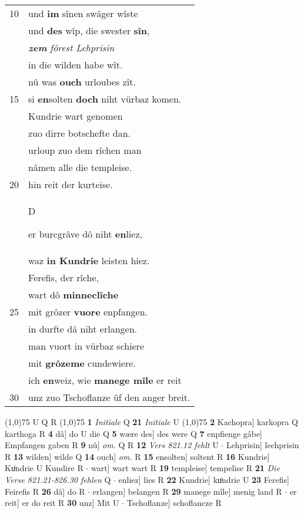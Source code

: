 \documentclass[8pt,a4paper,notitlepage]{article}
\begin{document}
\begin{table}[ht]
\begin{minipage}[t]{0.5\linewidth}
\begin{tabular}{rl}
10 & und \textbf{im} sînen swâger wîste\\ 
 & und \textbf{des} wîp, die swester \textbf{sîn},\\ 
 & \textit{\textbf{zem} fôrest Lehprisin}\\ 
 & in die wilden habe wît.\\ 
 & nû was \textbf{ouch} urloubes zît.\\ 
15 & si \textbf{en}solten \textbf{doch} niht vürbaz komen.\\ 
 & Kundrie wart genomen\\ 
 & zuo dirre botschefte dan.\\ 
 & urloup zuo dem rîchen man\\ 
 & nâmen alle die templeise.\\ 
20 & hin reit der kurteise.\\ 
 & \begin{large}D\end{large}er burcgrâve dô niht \textbf{en}liez,\\ 
 & waz \textbf{in Kundrie} leisten hiez.\\ 
 & Ferefis, der rîche,\\ 
 & wart dô \textbf{minneclîche}\\ 
25 & mit grôzer \textbf{vuore} enpfangen.\\ 
 & in durfte dâ niht erlangen.\\ 
 & man vuort in vürbaz schiere\\ 
 & mit \textbf{grôzeme} cundewiere.\\ 
 & ich \textbf{en}weiz, wie \textbf{manege mîle} er reit\\ 
30 & unz zuo Tschoflanze ûf den anger breit.\\ 
\end{tabular}
\scriptsize
\line(1,0){75} \newline
U Q R \newline
\line(1,0){75} \newline
\textbf{1} \textit{Initiale} Q  \textbf{21} \textit{Initiale} U  \newline
\line(1,0){75} \newline
\textbf{2} Kachopra] karkopra Q karthoga R \textbf{4} dâ] do U die Q \textbf{5} wære des] des were Q \textbf{7} enpfienge gâbe] Empfangen gaben R \textbf{9} nû] \textit{om.} Q R \textbf{12} \textit{Vers 821.12 fehlt} U   $\cdot$ Lehprisin] lechprisin R \textbf{13} wilden] wilde Q \textbf{14} ouch] \textit{om.} R \textbf{15} ensolten] soltent R \textbf{16} Kundrie] Kuͦndrie U Kundire R  $\cdot$ wart] wart wart R \textbf{19} templeise] tempelise R \textbf{21} \textit{Die Verse 821.21-826.30 fehlen} Q   $\cdot$ enliez] lies R \textbf{22} Kundrie] kuͦndrie U \textbf{23} Ferefis] Feirefis R \textbf{26} dâ] do R  $\cdot$ erlangen] belangen R \textbf{29} manege mîle] menig land R  $\cdot$ er reit] er do reit R \textbf{30} unz] Mit U  $\cdot$ Tschoflanze] schoflancze R \newline
\end{minipage}
\end{table}
\end{document}
